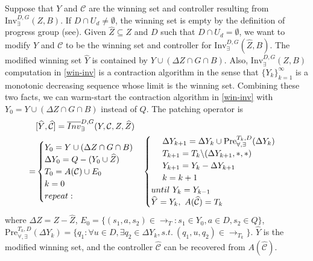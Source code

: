 Suppose that $ Y $ and $ \mathcal{C} $ are the winning set and controller resulting from $ \text{Inv}_{\exists}^{D,G}(Z,B) $. If $ D\cap U_d \not= \emptyset$, the winning set is empty by the definition of progress group (see\cite{Nilsson2017}). Given $ \widehat{Z} \subseteq Z $ and $D$ such that $ D\cap U_d=\emptyset $, we want to modify $ Y $ and $ \mathcal{C} $ to be the winning set and controller for $ \text{Inv}_{\exists}^{D,G}(\widehat{Z}, B) $.  The modified winning set $\widehat{Y}$ is contained by $ Y\cup (\Delta Z\cap G\cap B) $. Also, $ \text{Inv}_{\exists}^{D,G}(Z,B) $ computation in \eqref{win-inv} is a contraction algorithm in the sense that $ \{Y_k\}_{k=1}^{\infty} $ is a monotonic decreasing sequence whose limit is the winning set. Combining these two facts, we can warm-start the contraction algorithm in \eqref{win-inv} with $ Y_0=Y\cup (\Delta Z\cap G\cap B)$ instead of $ Q $. The patching operator is
{\small\begin{align}
&[\widehat{Y},\widehat{\mathcal{C}}]=\overline{Inv}_{\exists}^{D,G}(Y,\mathcal{C},Z,\widehat{Z})\nonumber \\
=&\begin{cases}
Y_0 = Y\cup (\Delta Z\cap G \cap B)\\
\Delta Y_0 = Q - (Y_0 \cup \widehat{Z})\\
T_0  = A(\mathcal{C})\cup E_0\\
{\color{black} k=0}\\
{\color{black} repeat:}\\
\end{cases}
\begin{cases}
\ \ \ \ \Delta Y_{k+1} = \Delta Y_k \cup \text{Pre}_{\forall,\exists}^{T_k,D}(\Delta Y_k) \\
\ \ \ \ T_{k+1} = T_{k}\backslash (\Delta Y_{k+1},*,*)\\
\ \ \ \ Y_{k+1} = Y_k- \Delta Y_{k+1}\\
\ \ \ \ {\color{black} k=k+1}\\
{\color{black} until \ Y_k = Y_{k-1}}\\
\widehat{Y}=Y_k,\ A(\widehat{\mathcal{C}}) = T_{k}
\end{cases}\label{patch-inv}
\end{align}}
where $ \Delta Z = Z - \widehat{Z} $, $ E_0 = \{(s_1,a,s_2)\in \rightarrow_{T}: s_1\in Y_0, a\in D, s_2 \in Q\} $, $ \text{Pre}_{\forall,\exists}^{T_k,D}(\Delta Y_k) = \{q_1: \forall u\in D, \exists q_2\in \Delta Y_k, s.t.\ (q_1, u, q_2) \in \rightarrow_{T_k} \} $. $ \widehat{Y} $ is the modified winning set, and the controller $ \widehat{\mathcal{C}} $ can be recovered from $ A(\widehat{\mathcal{C}}) $.

